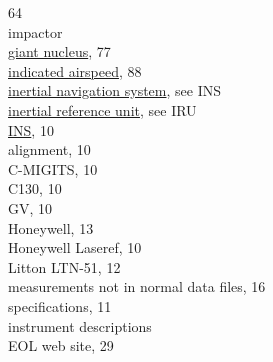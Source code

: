 \documentclass[
  english,
]{book}
\begin{document}
64\\
impactor\\
\hspace*{0.333em}\hspace*{0.333em}\href{./7-aerosol-particle-measurements.html\#special-aerosol}{giant
nucleus}, 77\\
\href{./10-obsolete-variables\#ias}{indicated airspeed}, 88\\
\href{./3-the-state-of-the-aircraft.html\#inertial-reference-systems}{inertial
navigation system}, see INS\\
\href{./10-obsolete-variables.html\#mdy}{inertial reference unit}, see
IRU\\
\href{./3-the-state-of-the-aircraft.html\#inertial-reference-systems}{INS},
10\\
\hspace*{0.333em}\hspace*{0.333em}alignment, 10\\
\hspace*{0.333em}\hspace*{0.333em}C-MIGITS, 10\\
\hspace*{0.333em}\hspace*{0.333em}C130, 10\\
\hspace*{0.333em}\hspace*{0.333em}GV, 10\\
\hspace*{0.333em}\hspace*{0.333em}Honeywell, 13\\
\hspace*{0.333em}\hspace*{0.333em}Honeywell Laseref, 10\\
\hspace*{0.333em}\hspace*{0.333em}Litton LTN-51, 12\\
\hspace*{0.333em}\hspace*{0.333em}measurements not in normal data files,
16\\
\hspace*{0.333em}\hspace*{0.333em}specifications, 11\\
instrument descriptions\\
\hspace*{0.333em}\hspace*{0.333em}EOL web site, 29\\
\end{document}
